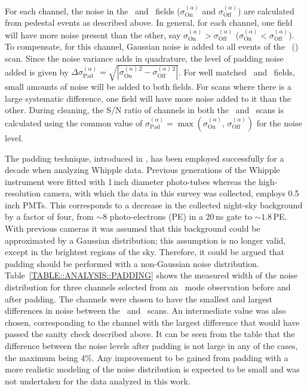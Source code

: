 For each channel, the noise in the \On\ and
\Off\ fields ($\sigma_\mathrm{On}^{(\alpha)}$ and
$\sigma_\mathrm{Off}^{(\alpha)}$) are calculated from pedestal events
as described above. In general, for each channel, one field will have
more noise present than the other, say
$\sigma_\mathrm{On}^{(\alpha)}>\sigma_\mathrm{Off}^{(\alpha)}$
($\sigma_\mathrm{On}^{(\alpha)}<\sigma_\mathrm{Off}^{(\alpha)}$). To
compensate, for this channel, Gaussian noise is added to all events of
the \Off\ (\On) scan. Since the noise variance adds in quadrature, the
level of padding noise added is given by
$\Delta\sigma_\mathrm{Pad}^{(\alpha)}=\sqrt{|\sigma_\mathrm{On}^{(\alpha)\,2}-\sigma_\mathrm{Off}^{(\alpha)\,2}|}$. For
well matched \On\ and \Off\ fields, small amounts of noise will be
added to both fields. For scans where there is a large systematic
difference, one field will have more noise added to it than the
other. During cleaning, the S/N ratio of channels in both the \On\ and
\Off\ scans is calculated using the common value of
$\sigma_\mathrm{Pad}^{(\alpha)}=\max(\sigma_\mathrm{On}^{(\alpha)},\,\sigma_\mathrm{Off}^{(\alpha)})$
for the noise level.

The padding technique, introduced in \citet{REF::CAWLEY::1993CALGARY},
has been employed successfully for a decade when analyzing Whipple
data. Previous generations of the Whipple instrument were fitted with
1\,inch diameter photo-tubes whereas the high-resolution camera, with
which the data in this survey was collected, employs 0.5\,inch
PMTs. This corresponds to a decrease in the collected night-sky
background by a factor of four, from $\sim8$ photo-electrons (PE) in a
20\,ns gate to $\sim1.8$\,PE. With previous cameras it was assumed
that this background could be approximated by a Gaussian distribution;
this assumption is no longer valid, except in the brightest regions of
the sky. Therefore, it could be argued that padding should be
performed with a non-Gaussian noise distribution. 
Table~\ref{TABLE::ANALYSIS::PADDING} shows the measured width of the
noise distribution for three channels selected from an
\Pairs\ mode observation before and after padding. The channels were
chosen to have the smallest and largest differences in noise between
the \On\ and \Off\ scans. An intermediate value was also chosen,
corresponding to the channel with the largest difference that would
have passed the sanity check described above. It can be seen from the
table that the difference between the noise levels after padding is
not large in any of the cases, the maximum being 4\%. Any improvement
to be gained from padding with a more realistic modeling of the noise
distribution is expected to be small and was not undertaken for the
data analyzed in this work.

